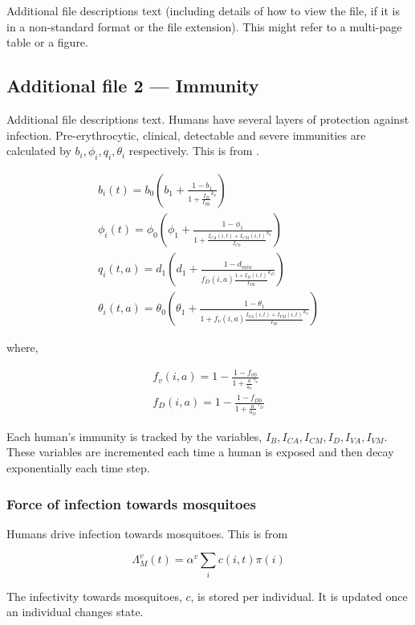 \documentclass{bmcart}
\begin{document}
\begin{backmatter}
    Additional file descriptions text (including details of how to
    view the file, if it is in a non-standard format or the file extension).  This might
    refer to a multi-page table or a figure.

  \subsection*{Additional file 2 --- Immunity}
    Additional file descriptions text.
    Humans have several layers of protection against infection. Pre-erythrocytic, clinical, detectable and severe immunities are calculated by $b_i, \phi_i, q_i, \theta_i$ respectively. This is from \cite{griffin_reducing_2010}.

\begin{gather*}
b_i(t) = b_0 \left( b_1 + \frac{1 - b_1}{1 + \frac{I_B}{I_{B0}}^{k_b}} \right)\\
\phi_i(t) = \phi_0 \left( \phi_1 + \frac{1 - \phi_1}{1 + \frac{I_{CA}(i, t) + I_{CM}(i, t)}{I_{C0}}^{k_c}} \right) \\
q_i(t, a) = d_1 \left( d_1 + \frac{1 - d_{min}}{f_D(i, a)\frac{1 + I_D(i, t)}{I_{D0}}^{k_D}} \right) \\
\theta_i(t, a) = \theta_0 \left( \theta_1 + \frac{1 - \theta_1}{1 + f_v(i, a)\frac{I_{VA}(i, t) + I_{VM}(i, t)}{I_{V0}}^{k_v}} \right)
\end{gather*}

where,

\begin{gather*}
f_v(i, a) = 1 - \frac{1 - f_{v0}}{1 + \frac{a}{a_v}^{\gamma_v}} \\
f_D(i, a) = 1 - \frac{1 - f_{D0}}{1 + \frac{a}{a_D}^{\gamma_D}}
\end{gather*}

Each human's immunity is tracked by the variables, $I_B, I_{CA}, I_{CM}, I_D, I_{VA}, I_{VM}$. These variables are incremented each time a human is exposed and then decay exponentially each time step.
\subsubsection{Force of infection towards mosquitoes}

Humans drive infection towards mosquitoes. This is from \cite{griffin_reducing_2010}

\[
\Lambda^v_M(t) = \alpha^v \sum_i c(i, t) \pi(i)
\]

The infectivity towards mosquitoes, $c$, is stored per individual. It is updated once an individual changes state.


\end{backmatter}
\end{document}
